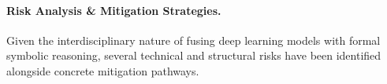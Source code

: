 \documentclass[a4paper]{article}
\begin{document}
\paragraph*{Risk Analysis \& Mitigation Strategies.}
Given the interdisciplinary nature of fusing deep learning models with formal symbolic reasoning, several technical and structural risks have been identified alongside concrete mitigation pathways.

\end{document}
